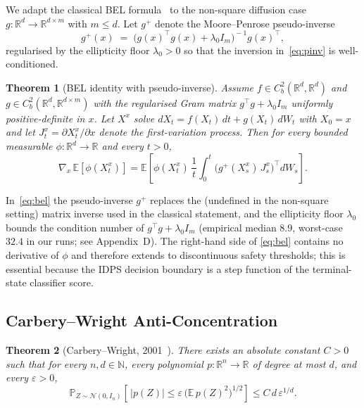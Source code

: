 \documentclass{ieeeaccess}
\newtheorem{theorem}{Theorem}
\newcommand{\Real}{\mathbb{R}}
\newcommand{\Exp}{\mathbb{E}}
\newcommand{\Prob}{\mathbb{P}}
\newcommand{\Ncal}{\mathcal{N}}
\newcommand{\pinv}{{+}}   %
\begin{document}
We adapt the classical BEL formula~\cite{bismut1981martingales,
elworthy1994formulae,hsu2002} to the non-square diffusion case
$g:\Real^d\!\to\!\Real^{d\times m}$ with $m\leq d$. Let $g^{\pinv}$
denote the Moore--Penrose pseudo-inverse
\begin{equation}\label{eq:pinv}
   g^{\pinv}(x) \;=\; \bigl(g(x)^\top g(x) + \lambda_0 I_m\bigr)^{\!-1}
                       g(x)^\top,
\end{equation}
regularised by the ellipticity floor $\lambda_0>0$ so that the
inversion in~\eqref{eq:pinv} is well-conditioned.

\begin{theorem}[BEL identity with pseudo-inverse]\label{thm:bel}
Assume $f\in C^2_b(\Real^d,\Real^d)$ and
$g\in C^2_b(\Real^d,\Real^{d\times m})$ with the regularised
Gram matrix $g^\top g + \lambda_0 I_m$ uniformly positive-definite
in $x$. Let $X^x$ solve $dX_t=f(X_t)\,dt+g(X_t)\,dW_t$ with
$X_0=x$ and let $J^x_t=\partial X^x_t/\partial x$ denote the
first-variation process. Then for every bounded measurable
$\phi:\Real^d\!\to\!\Real$ and every $t>0$,
\begin{equation}\label{eq:bel}
  \nabla_x\,\Exp[\phi(X^x_t)]
  = \Exp\!\left[\phi(X^x_t)\,\frac{1}{t}\!\int_0^t\!
      \!\bigl(g^{\pinv}(X^x_s)\,J^x_s\bigr)^{\!\top}\!dW_s\right].
\end{equation}
\end{theorem}

In~\eqref{eq:bel} the pseudo-inverse $g^{\pinv}$ replaces the (undefined
in the non-square setting) matrix inverse used in the classical
statement, and the ellipticity floor $\lambda_0$ bounds the condition
number of $g^\top g + \lambda_0 I_m$ (empirical median $8.9$, worst-case
$32.4$ in our runs; see Appendix~D). The right-hand side of
\eqref{eq:bel} contains no derivative of $\phi$ and therefore extends
to discontinuous safety thresholds; this is essential because the IDPS
decision boundary is a step function of the terminal-state classifier
score.

\subsection{Carbery--Wright Anti-Concentration}\label{subsec:cw}
\begin{theorem}[Carbery--Wright, 2001~\cite{carbery2001anticonc}]\label{thm:cw}
There exists an absolute constant $C>0$ such that for every
$n,d\in\mathbb{N}$, every polynomial $p:\Real^n\!\to\!\Real$ of degree
at most $d$, and every $\varepsilon>0$,
\begin{equation}\label{eq:cw}
  \Prob_{Z\sim\Ncal(0,I_n)}\!\left[\,|p(Z)|\le
   \varepsilon\,\bigl(\Exp\,p(Z)^2\bigr)^{1/2}\right]
   \leq C\,d\,\varepsilon^{1/d}.
\end{equation}
\end{theorem}
\end{document}
